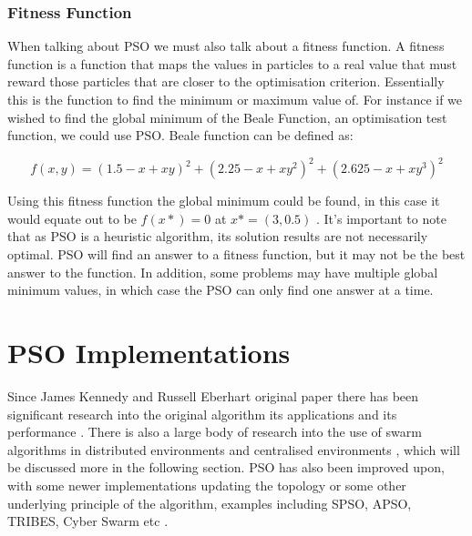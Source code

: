 \documentclass[oneside,12pt]{book}
\begin{document}
\subsubsection{Fitness Function}
When talking about PSO we must also talk about a fitness function. A fitness function is a function that maps the values in particles to a real value that must reward those particles that are closer to the optimisation criterion. Essentially this is the function to find the minimum or maximum value of. For instance if we wished to find the global minimum of the Beale Function, an optimisation test function, we could use PSO. Beale function can be defined as:

\begin{equation}
f(x, y) = (1.5-x+xy)^2+(2.25-x+xy^2)^2+(2.625-x+xy^3)^2
\end{equation}

Using this fitness function the global minimum could be found, in this case it would equate out to be $f(x*)=0$ at $x*=(3,0.5)$ \cite{bingham}. It's important to note that as PSO is a heuristic algorithm, its solution results are not necessarily optimal. PSO will find an answer to a fitness function, but it may not be the best answer to the function. In addition, some problems may have multiple global minimum values, in which case the PSO can only find one answer at a time.

\section{PSO Implementations}
Since James Kennedy and Russell Eberhart original paper there has been significant research into the original algorithm \cite{piotrowski_napiorkowski_piotrowska_2020, bai_2010, imrantextordfeminine2013overview, wang_tan_liu_2017} its applications \cite{hereford_2006, beni_2005, blum_li, raquel2005effective} and its performance \cite{yin_yu_wang_wang_2006, kennedy_1999}. There is also a large body of research into the use of swarm algorithms in distributed environments \cite{akat_gazi_2008, salza_ferrucci_2019, peleg_2005} and centralised environments \cite{trelea_2003, xie2003overview, poli2007particle}, which will be discussed more in the following section. PSO has also been improved upon, with some newer implementations updating the topology or some other underlying principle of the algorithm, examples including SPSO, APSO, TRIBES, Cyber Swarm etc \cite{zhou2009gpu, oca_stutzle_birattari_dorigo_2009, cooren2009performance, yin2010cyber}.
\end{document}
